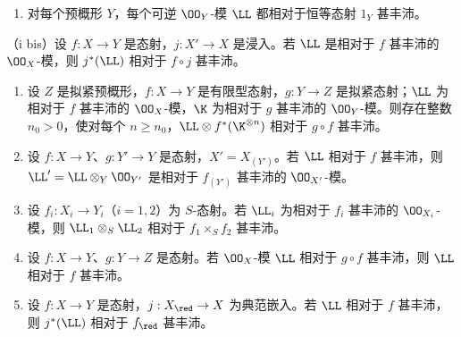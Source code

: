 \begin{enumerate}[label=(\roman*)]
\item 对每个预概形 $Y$，每个可逆 $\OO_Y$-模 $\LL$ 都相对于恒等态射 $1_Y$ 甚丰沛。
\end{enumerate}
\noindent（i bis）设 $f:X\to Y$ 是态射，$j:X'\to X$ 是浸入。若 $\LL$ 是相对于 $f$ 甚丰沛的 $\OO_X$-模，则 $j^*(\LL)$ 相对于 $f\circ j$ 甚丰沛。
\begin{enumerate}[label=(\roman*),start=2]
\item 设 $Z$ 是拟紧预概形，$f:X\to Y$ 是有限型态射，$g:Y\to Z$ 是拟紧态射；$\LL$ 为相对于 $f$ 甚丰沛的 $\OO_X$-模，$\K$ 为相对于 $g$ 甚丰沛的 $\OO_Y$-模。则存在整数 $n_0>0$，使对每个 $n\geq n_0$，$\LL\otimes f^*(\K^{\otimes n})$ 相对于 $g\circ f$ 甚丰沛。
\item 设 $f:X\to Y$、$g:Y'\to Y$ 是态射，$X'=X_{(Y')}$。若 $\LL$ 相对于 $f$ 甚丰沛，则 $\LL'=\LL\otimes_Y\OO_{Y'}$ 是相对于 $f_{(Y')}$ 甚丰沛的 $\OO_{X'}$-模。
\item 设 $f_i:X_i\to Y_i$（$i=1,2$）为 $S$-态射。若 $\LL_i$ 为相对于 $f_i$ 甚丰沛的 $\OO_{X_i}$-模，则 $\LL_1\otimes_S\LL_2$ 相对于 $f_1\times_S f_2$ 甚丰沛。
\item 设 $f:X\to Y$、$g:Y\to Z$ 是态射。若 $\OO_X$-模 $\LL$ 相对于 $g\circ f$ 甚丰沛，则 $\LL$ 相对于 $f$ 甚丰沛。
\item 设 $f:X\to Y$ 是态射，$j:X_{\red}\to X$ 为典范嵌入。若 $\LL$ 相对于 $f$ 甚丰沛，则 $j^*(\LL)$ 相对于 $f_{\red}$ 甚丰沛。
\end{enumerate}
